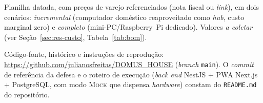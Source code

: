 \label{ap:bom}

Planilha datada, com preços de varejo referenciados (nota fiscal ou \textit{link}),
em dois cenários: \emph{incremental} (computador doméstico reaproveitado como
\textit{hub}, custo marginal zero) e \emph{completo} (mini-PC/Raspberry~Pi dedicado).
Valores \textit{a coletar} (ver Seção~\ref{sec:res-custo}, Tabela~\ref{tab:bom}).

\label{ap:repo}

Código-fonte, histórico e instruções de reprodução:
\newline\url{https://github.com/julianosfreitas/DOMUS_HOUSE} (\textit{branch} \texttt{main}).
O \textit{commit} de referência da defesa e o roteiro de execução (\emph{back end}
NestJS + PWA Next.js + PostgreSQL, com modo \textsc{Mock} que dispensa \textit{hardware})
constam do \texttt{README.md} do repositório.
